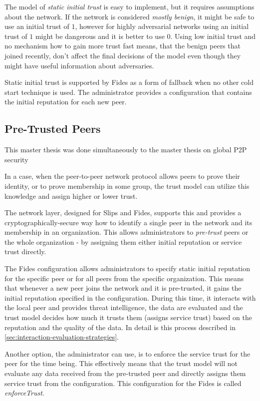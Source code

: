 The model of \textit{static initial trust} is easy to implement, but it requires assumptions about the network. If the network is considered \textit{mostly benign}, it might be safe to use an initial trust of $1$, however for highly adversarial networks using an initial trust of $1$ might be dangerous and it is better to use $0$. 
Using low initial trust and no mechanism how to gain more trust fast means, that the benign peers that joined recently, don't affect the final decisions of the model even though they might have useful information about adversaries.

Static initial trust is supported by Fides as a form of fallback when no other cold start technique is used. The administrator provides a configuration that contains the initial reputation for each new peer.

\subsection{Pre-Trusted Peers}
\label{subsec:pre-trusted-peers}

This master thesis was done simultaneously to the master thesis on global P2P security 


In a case, when the peer-to-peer network protocol allows peers to prove their identity, or to prove membership in some group, the trust model can utilize this knowledge and assign higher or lower trust.

The network layer, designed for Slips and Fides, supports this\cite{nl} and provides a cryptographically-secure way how to identify a single peer in the network and its membership in an organization.
This allows administrators to \textit{pre-trust} peers or the whole organization - by assigning them either initial reputation or service trust directly.

The Fides configuration allows administrators to specify static initial reputation for the specific peer or for all peers from the specific organization. 
This means that whenever a new peer joins the network and it is pre-trusted, it gains the initial reputation specified in the configuration.
During this time, it interacts with the local peer and provides threat intelligence, the data are evaluated and the trust model decides how much it trusts them (assigns service trust) based on the reputation and the quality of the data. In detail is this process described in \ref{sec:interaction-evaluation-strategies}.

Another option, the administrator can use, is to enforce the service trust for the peer for the time being. This effectively means that the trust model will not evaluate any data received from the pre-trusted peer and directly assigns them service trust from the configuration. This configuration for the Fides is called \textit{enforceTrust}.

